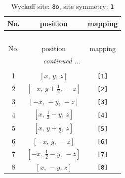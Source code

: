 \documentclass[fleqn,8pt]{jsarticle}
\begin{document}
\renewcommand{\arraystretch}{1.2}
\begin{longtable}{ccc}
\caption{Wyckoff site: {\tt 8o}, site symmetry: {\tt 1}}
 \\
 \hline \hline
No. & position & mapping \\ \hline \endfirsthead

\multicolumn{2}{l}{\tablename\ \thetable{}} \\
 \hline \hline
No. & position & mapping \\ \hline \endhead

 \hline \hline
\multicolumn{2}{r}{\footnotesize\it continued ...} \\ \endfoot

 \hline \hline
\multicolumn{2}{r}{} \\ \endlastfoot

1 & $\left[ x,\, y,\, z \right]$ & {\tt [1]} \\ \hline
2 & $\left[ - x,\, y + \frac{1}{2},\, - z \right]$ & {\tt [2]} \\ \hline
3 & $\left[ - x,\, - y,\, - z \right]$ & {\tt [3]} \\ \hline
4 & $\left[ x,\, \frac{1}{2} - y,\, z \right]$ & {\tt [4]} \\ \hline
5 & $\left[ x,\, y + \frac{1}{2},\, z \right]$ & {\tt [5]} \\ \hline
6 & $\left[ - x,\, y,\, - z \right]$ & {\tt [6]} \\ \hline
7 & $\left[ - x,\, \frac{1}{2} - y,\, - z \right]$ & {\tt [7]} \\ \hline
8 & $\left[ x,\, - y,\, z \right]$ & {\tt [8]} \\
\end{longtable}
\end{document}
